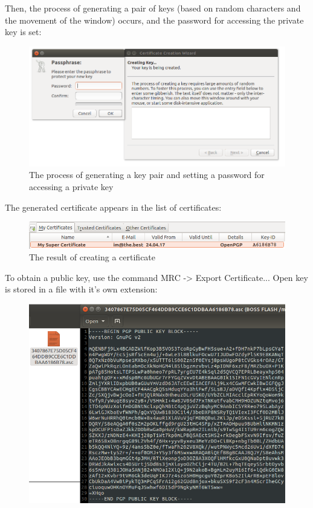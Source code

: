 \documentclass[14pt,a4paper,report]{report}
\begin{document}
Then, the process of generating a pair of keys (based on random characters and the movement of the window) occurs, and the password for accessing the private key is set:

\begin{figure}[h!]
	\centering
	\includegraphics[scale = 0.65]{images/1_3.png}
	\caption{The process of generating a key pair and setting a password for accessing a private key}
\end{figure}

The generated certificate appears in the list of certificates:

\begin{figure}[h!]
	\centering
	\includegraphics[scale = 0.7]{images/1_4.png}
	\caption{The result of creating a certificate}
\end{figure}

To obtain a public key, use the command MRC -> Export Certificate... Open key is stored in a file with it's own extension:

\begin{figure}[h!]
	\centering
	\includegraphics[scale = 0.65]{images/1_5.png}
	\caption{}
\end{figure}
\end{document}
